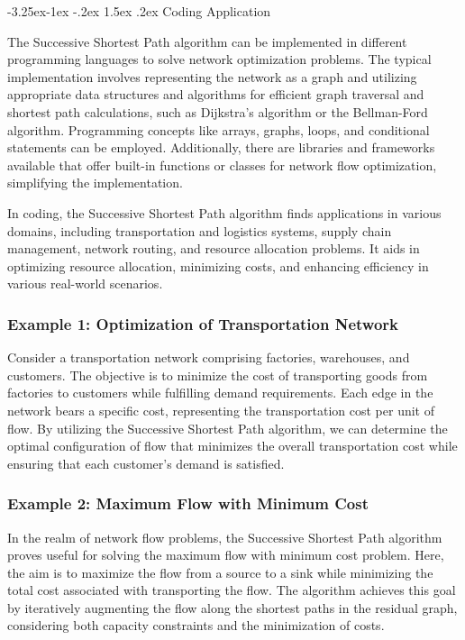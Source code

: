 \documentclass[a4paper]{article}
\makeatletter
\newcounter {subsubsubsection}[subsubsection]
\newcommand\subsubsubsection{\@startsection{subsubsubsection}{4}{\z@}%
	{-3.25ex\@plus -1ex \@minus -.2ex}%
	{1.5ex \@plus .2ex}%
	{\normalfont\normalsize\bfseries}}
\makeatother
\begin{document}
		\subsubsubsection{Coding Application}
		
		The Successive Shortest Path algorithm can be implemented in different programming languages to solve network optimization problems. The typical implementation involves representing the network as a graph and utilizing appropriate data structures and algorithms for efficient graph traversal and shortest path calculations, such as Dijkstra's algorithm or the Bellman-Ford algorithm. Programming concepts like arrays, graphs, loops, and conditional statements can be employed. Additionally, there are libraries and frameworks available that offer built-in functions or classes for network flow optimization, simplifying the implementation.
		
		In coding, the Successive Shortest Path algorithm finds applications in various domains, including transportation and logistics systems, supply chain management, network routing, and resource allocation problems. It aids in optimizing resource allocation, minimizing costs, and enhancing efficiency in various real-world scenarios.
		
		\subsubsection{Example 1: Optimization of Transportation Network}
		
		Consider a transportation network comprising factories, warehouses, and customers. The objective is to minimize the cost of transporting goods from factories to customers while fulfilling demand requirements. Each edge in the network bears a specific cost, representing the transportation cost per unit of flow. By utilizing the Successive Shortest Path algorithm, we can determine the optimal configuration of flow that minimizes the overall transportation cost while ensuring that each customer's demand is satisfied.
		
		\subsubsection{Example 2: Maximum Flow with Minimum Cost}
		
		In the realm of network flow problems, the Successive Shortest Path algorithm proves useful for solving the maximum flow with minimum cost problem. Here, the aim is to maximize the flow from a source to a sink while minimizing the total cost associated with transporting the flow. The algorithm achieves this goal by iteratively augmenting the flow along the shortest paths in the residual graph, considering both capacity constraints and the minimization of costs.
		
\end{document}
